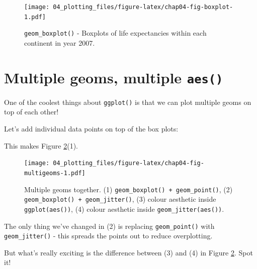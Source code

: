 \documentclass[
  12pt,
  krantz2]{krantz}
\makeatletter
\newenvironment{Shaded}{\begin{snugshade}}{\end{snugshade}}
\newcommand{\DataTypeTok}[1]{\textcolor[rgb]{0.13,0.29,0.53}{#1}}
\newcommand{\KeywordTok}[1]{\textcolor[rgb]{0.13,0.29,0.53}{\textbf{#1}}}
\newcommand{\NormalTok}[1]{#1}
\newcommand{\OperatorTok}[1]{\textcolor[rgb]{0.81,0.36,0.00}{\textbf{#1}}}
\newcommand{\StringTok}[1]{\textcolor[rgb]{0.31,0.60,0.02}{#1}}
\newenvironment{kframe}{%
\medskip{}
\setlength{\fboxsep}{.8em}
 \def\at@end@of@kframe{}%
 \ifinner\ifhmode%
  \def\at@end@of@kframe{\end{minipage}}%
  \begin{minipage}{\columnwidth}%
 \fi\fi%
 \def\FrameCommand##1{\hskip\@totalleftmargin \hskip-\fboxsep
 \colorbox{shadecolor}{##1}\hskip-\fboxsep
     \hskip-\linewidth \hskip-\@totalleftmargin \hskip\columnwidth}%
 \MakeFramed {\advance\hsize-\width
   \@totalleftmargin\z@ \linewidth\hsize
   \@setminipage}}%
 {\par\unskip\endMakeFramed%
 \at@end@of@kframe}
\renewenvironment{Shaded}{\begin{kframe}}{\end{kframe}}
\makeatother
\begin{document}
\begin{figure}
\centering
\texttt{[image: 04\_plotting\_files/figure-latex/chap04-fig-boxplot-1.pdf]}
\caption{\label{fig:chap04-fig-boxplot}\texttt{geom\_boxplot()} - Boxplots of life expectancies within each continent in year 2007.}
\end{figure}

\hypertarget{multiple-geoms-multiple-aes}{%
\section{\texorpdfstring{Multiple geoms, multiple \texttt{aes()}}{Multiple geoms, multiple aes()}}\label{multiple-geoms-multiple-aes}}

One of the coolest things about \texttt{ggplot()} is that we can plot multiple geoms on top of each other!

Let's add individual data points on top of the box plots:

\begin{Shaded}
\end{Shaded}

This makes Figure \ref{fig:chap04-fig-multigeoms}(1).

\begin{figure}
\centering
\texttt{[image: 04\_plotting\_files/figure-latex/chap04-fig-multigeoms-1.pdf]}
\caption{\label{fig:chap04-fig-multigeoms}Multiple geoms together. (1) \texttt{geom\_boxplot()\ +\ geom\_point()}, (2) \texttt{geom\_boxplot()\ +\ geom\_jitter()}, (3) colour aesthetic inside \texttt{ggplot(aes())}, (4) colour aesthetic inside \texttt{geom\_jitter(aes())}.}
\end{figure}

The only thing we've changed in (2) is replacing \texttt{geom\_point()} with \texttt{geom\_jitter()} - this spreads the points out to reduce overplotting.

But what's really exciting is the difference between (3) and (4) in Figure \ref{fig:chap04-fig-multigeoms}. Spot it!

\end{document}
